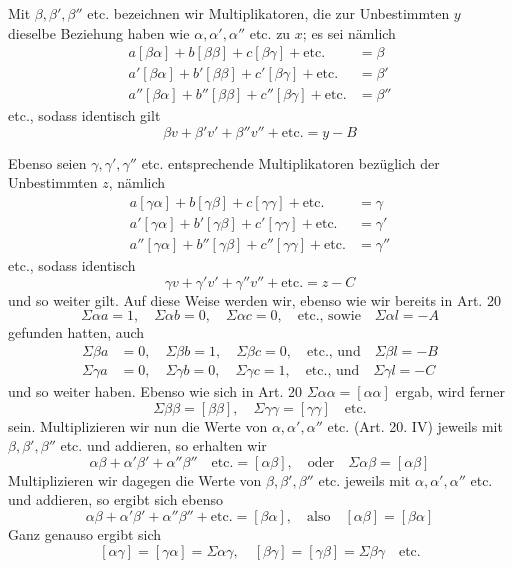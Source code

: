 Mit \(\beta,\beta',\beta''\) etc. bezeichnen wir Multiplikatoren, die zur Unbestimmten \(y\) dieselbe Beziehung haben wie \(\alpha,\alpha',\alpha''\) etc. zu \(x\); es sei nämlich
\[
\begin{aligned}
a[\beta\alpha]+b[\beta\beta]+c[\beta\gamma]+\text{etc.}&=\beta\\
a'[\beta\alpha]+b'[\beta\beta]+c'[\beta\gamma]+\text{etc.}&=\beta'\\
a''[\beta\alpha]+b''[\beta\beta]+c''[\beta\gamma]+\text{etc.}&=\beta''
\end{aligned}
\]
etc., sodass identisch gilt
\[
\beta v+\beta'v'+\beta''v''+\text{etc.}=y-B
\]
\par{}
Ebenso seien \(\gamma,\gamma',\gamma''\) etc. entsprechende Multiplikatoren bezüglich der Unbestimmten \(z\), nämlich
\[
\begin{aligned}
a[\gamma\alpha]+b[\gamma\beta]+c[\gamma\gamma]+\text{etc.}&=\gamma\\
a'[\gamma\alpha]+b'[\gamma\beta]+c'[\gamma\gamma]+\text{etc.}&=\gamma'\\
a''[\gamma\alpha]+b''[\gamma\beta]+c''[\gamma\gamma]+\text{etc.}&=\gamma''
\end{aligned}
\]
etc., sodass identisch
\[
\gamma v+\gamma'v'+\gamma''v''+\text{etc.}=z-C
\]
und so weiter gilt. Auf diese Weise werden wir, ebenso wie wir bereits in Art. 20
\[
\Sigma\alpha a=1,\quad\Sigma\alpha b=0,\quad\Sigma\alpha c=0,\quad\text{etc., sowie}\quad\Sigma\alpha l=-A
\]
gefunden hatten, auch
\[
\begin{aligned}
\Sigma\beta a&=0,\quad\Sigma\beta b=1,\quad\Sigma\beta c=0,\quad\text{etc., und}\quad\Sigma\beta l=-B\\
\Sigma\gamma a&=0,\quad\Sigma\gamma b=0,\quad\Sigma\gamma c=1,\quad\text{etc., und}\quad\Sigma\gamma l=-C
\end{aligned}
\]
und so weiter haben. Ebenso wie sich in Art. 20 \(\Sigma\alpha\alpha=[\alpha\alpha]\) ergab, wird ferner
\[
\Sigma\beta\beta=[\beta\beta],\quad\Sigma\gamma\gamma=[\gamma\gamma]\quad\text{etc.}
\]
sein. Multiplizieren wir nun die Werte von \(\alpha,\alpha',\alpha''\) etc. (Art. 20. IV) jeweils mit \(\beta,\beta',\beta''\) etc. und addieren, so erhalten wir
\[
\alpha\beta+\alpha'\beta'+\alpha''\beta''\quad\text{etc.}=[\alpha\beta],\quad\text{oder}\quad\Sigma\alpha\beta=[\alpha\beta]
\]
Multiplizieren wir dagegen die Werte von \(\beta,\beta',\beta''\) etc. jeweils mit \(\alpha,\alpha',\alpha''\) etc. und addieren, so ergibt sich ebenso
\[
\alpha\beta+\alpha'\beta'+\alpha''\beta''+\text{etc.}=[\beta\alpha],\quad\text{also}\quad[\alpha\beta]=[\beta\alpha]
\]
Ganz genauso ergibt sich
\[
[\alpha\gamma]=[\gamma\alpha]=\Sigma\alpha\gamma,\quad[\beta\gamma]=[\gamma\beta]=\Sigma\beta\gamma\quad\text{etc.}
\]
\clearpage
